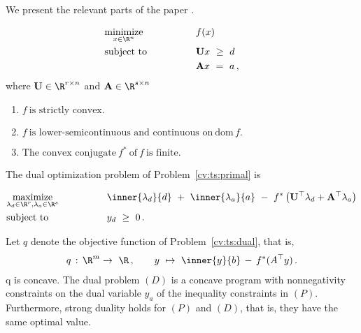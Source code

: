 We present the relevant parts of the paper \cite{Bertsekas2003}.
\begin{fproblem}
  \label{cv:ts:primal}
\begin{align*}
    &\underset{x \in \R^n}
    {\text{minimize}}
    &&\qquad\qquad
    f(x)
    &&&
    \\
    &\text{subject to}
    &&\qquad\qquad
    \mathbf{U}x
    \ 
    \ge
    \ 
    d
    \\
    &
    &&\qquad\qquad
    \mathbf{A}x
    \ 
    =
    \ 
    a
    \,,
\end{align*}
where 
$\mathbf{U}\in \R^{r\times n}$
and
$\mathbf{A}\in \R^{s\times n}$
\end{fproblem}
\begin{assumptions*}
  \begin{enumerate}[label={(\roman*)}]
    Assume that the map 
    $
      f: \R^n \to \overline{\R}
    $
    has the following properties.
    \item
      $
        f 
        \ 
        \text{is strictly convex.}
      $
    \item
      $
        f
        \ 
        \text{is lower-semicontinuous and continuous on}
        \ 
        \mathrm{dom}\,f
        .
      $
    \item
      $
        \text{The convex conjugate}
        \ 
        f^*
        \ 
        \text{of}\ 
        f
        \ 
        \text{is finite}
        .
      $
  \end{enumerate}
\end{assumptions*}

The dual optimization problem of Problem~\ref{cv:ts:primal} 
is
\begin{fproblem}
  \label{cv:ts:dual}
  \begin{alignat*}{2}
    &\underset{
    \lambda_d \in \R^r
,
    \lambda_a \in \R^s
  }
    {\text{maximize}}
    &&\qquad\qquad
    \inner
    {\lambda_d}
    {d}
    \ 
    +
    \ 
    \inner
    {\lambda_a}
    {a}
    \ 
    -
    \ 
    f^*
    \left( 
      \mathbf{U}^\top  \lambda_d
      +
      \mathbf{A}^\top  \lambda_a
    \right)
    \\
    &\text{subject to}
    &&\qquad\qquad
    y_d
    \ 
    \ge
    \ 
    0
    \,.
\end{alignat*}
\end{fproblem}
Let $q$ denote the objective function of Problem~\ref{cv:ts:dual},
that is,
\begin{gather}
  q
  \, 
  : 
  \, 
  \R^m  \to\  \R\,,
  \qquad
  y
  \ 
  \mapsto
  \ 
  \inner
    {y}
    {b}
    \, 
    -
    \, 
    f^*
    ( A ^ \top y )
  \,.
\end{gather}
q is concave.
The dual problem $(D)$ is a concave program
with nonnegativity constraints on the dual variable $y_a$
of the inequality constraints in $(P)$.
Furthermore, strong duality holds for $(P)$ and $(D)$,
that is, they have the same optimal value.

